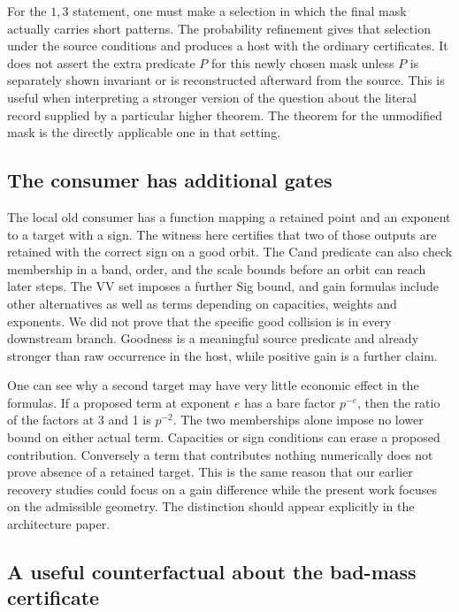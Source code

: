 \documentclass[12pt,letterpaper]{article}
\DeclareRobustCommand{\id}[1]{\mbox{\small\ttfamily #1}}
\begin{document}
For the \(1,3\) statement, one must make a selection in which the final mask actually carries short patterns. The probability refinement gives that selection under the source conditions and produces a host with the ordinary certificates. It does not assert the extra predicate \(P\) for this newly chosen mask unless \(P\) is separately shown invariant or is reconstructed afterward from the source. This is useful when interpreting a stronger version of the question about the literal record supplied by a particular higher theorem. The theorem for the unmodified mask is the directly applicable one in that setting.

\subsection{The consumer has additional gates}

The local old consumer has a function mapping a retained point and an exponent to a target with a sign. The witness here certifies that two of those outputs are retained with the correct sign on a good orbit. The \id{Cand} predicate can also check membership in a band, order, and the scale bounds before an orbit can reach later steps. The \id{VV} set imposes a further \id{Sig} bound, and gain formulas include other alternatives as well as terms depending on capacities, weights and exponents. We did not prove that the specific good collision is in every downstream branch. Goodness is a meaningful source predicate and already stronger than raw occurrence in the host, while positive gain is a further claim.

One can see why a second target may have very little economic effect in the formulas. If a proposed term at exponent \(e\) has a bare factor \(p^{-e}\), then the ratio of the factors at 3 and 1 is \(p^{-2}\). The two memberships alone impose no lower bound on either actual term. Capacities or sign conditions can erase a proposed contribution. Conversely a term that contributes nothing numerically does not prove absence of a retained target. This is the same reason that our earlier recovery studies could focus on a gain difference while the present work focuses on the admissible geometry. The distinction should appear explicitly in the architecture paper.

\subsection{A useful counterfactual about the bad-mass certificate}
\end{document}
